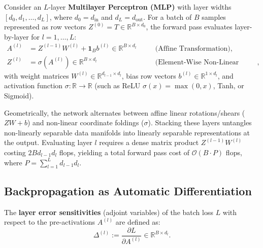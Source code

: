 Consider an $L$-layer \textbf{Multilayer Perceptron (MLP)} with layer widths $[d_0, d_1, \dots, d_L]$, where $d_0 = d_{\text{in}}$ and $d_L = d_{\text{out}}$. For a batch of $B$ samples represented as row vectors $Z^{(0)} = T \in \mathbb{R}^{B \times d_0}$, the forward pass evaluates layer-by-layer for $l = 1, \dots, L$:
\begin{align}
    A^{(l)} &= Z^{(l-1)} W^{(l)} + \mathbf{1}_B b^{(l)} \in \mathbb{R}^{B \times d_l} \quad &&\text{(Affine Transformation)}, \\
    Z^{(l)} &= \sigma\left( A^{(l)} \right) \in \mathbb{R}^{B \times d_l} \quad &&\text{(Element-Wise Non-Linear Activation)},
\end{align}
with weight matrices $W^{(l)} \in \mathbb{R}^{d_{l-1} \times d_l}$, bias row vectors $b^{(l)} \in \mathbb{R}^{1 \times d_l}$, and activation function $\sigma: \mathbb{R} \to \mathbb{R}$ (such as ReLU $\sigma(x) = \max(0, x)$, Tanh, or Sigmoid).

Geometrically, the network alternates between affine linear rotations/shears ($Z W + b$) and non-linear coordinate foldings ($\sigma$). Stacking these layers untangles non-linearly separable data manifolds into linearly separable representations at the output. Evaluating layer $l$ requires a dense matrix product $Z^{(l-1)} W^{(l)}$ costing $2 B d_{l-1} d_l$ flops, yielding a total forward pass cost of $\mathcal{O}(B \cdot P)$ flops, where $P = \sum_{l=1}^L d_{l-1} d_l$.

\newpage
\subsection{Backpropagation as Automatic Differentiation}

\begin{definition}
    The \textbf{layer error sensitivities} (adjoint variables) of the batch loss $L$ with respect to the pre-activations $A^{(l)}$ are defined as:
    \begin{equation}
        \Delta^{(l)} := \frac{\partial L}{\partial A^{(l)}} \in \mathbb{R}^{B \times d_l}.
    \end{equation}
\end{definition}

